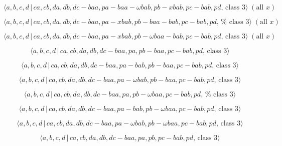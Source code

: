 \documentclass[10pt]{article}
\begin{document}
\begin{equation}
\langle a,b,c,d\,|\,ca,cb,da,db,dc-baa,pa-baa-\omega bab,pb-xbab,pc-bab,pd,\,%
\text{class }3\rangle \;(\text{all }x)  \tag{7.3473}
\end{equation}

\begin{equation}
\langle a,b,c,d\,|\,ca,cb,da,db,dc-baa,pa-xbab,pb-baa-bab,pc-bab,pd,\,\text{%
class }3\rangle \;(\text{all }x)  \tag{7.3474}
\end{equation}

\begin{equation}
\langle a,b,c,d\,|\,ca,cb,da,db,dc-baa,pa-xbab,pb-\omega baa-bab,pc-bab,pd,\,%
\text{class }3\rangle \;(\text{all }x)  \tag{7.3475}
\end{equation}

\begin{equation}
\langle a,b,c,d\,|\,ca,cb,da,db,dc-baa,pa,pb-baa,pc-bab,pd,\,\text{class }%
3\rangle  \tag{7.3476}
\end{equation}

\begin{equation}
\langle a,b,c,d\,|\,ca,cb,da,db,dc-baa,pa-bab,pb-baa,pc-bab,pd,\,\text{class 
}3\rangle  \tag{7.3477}
\end{equation}

\begin{equation}
\langle a,b,c,d\,|\,ca,cb,da,db,dc-baa,pa-\omega bab,pb-baa,pc-bab,pd,\,%
\text{class }3\rangle  \tag{7.3478}
\end{equation}

\begin{equation}
\langle a,b,c,d\,|\,ca,cb,da,db,dc-baa,pa,pb-\omega baa,pc-bab,pd,\,\text{%
class }3\rangle  \tag{7.3479}
\end{equation}

\begin{equation}
\langle a,b,c,d\,|\,ca,cb,da,db,dc-baa,pa-bab,pb-\omega baa,pc-bab,pd,\,%
\text{class }3\rangle  \tag{7.3480}
\end{equation}

\begin{equation}
\langle a,b,c,d\,|\,ca,cb,da,db,dc-baa,pa-\omega bab,pb-\omega
baa,pc-bab,pd,\,\text{class }3\rangle  \tag{7.3481}
\end{equation}

\begin{equation}
\langle a,b,c,d\,|\,ca,cb,da,db,dc-baa,pa,pb,pc-bab,pd,\,\text{class }%
3\rangle  \tag{7.3482}
\end{equation}
\end{document}
